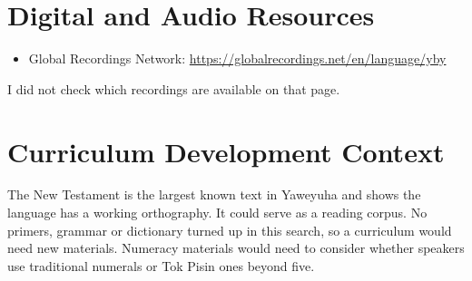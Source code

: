 \documentclass[12pt]{article}
\begin{document}
\section{Digital and Audio Resources}
\begin{itemize}
\item Global Recordings Network: \url{https://globalrecordings.net/en/language/yby}
\end{itemize}
I did not check which recordings are available on that page.

\section{Curriculum Development Context}
The New Testament is the largest known text in Yaweyuha and shows the language has a working orthography. It could serve as a reading corpus. No primers, grammar or dictionary turned up in this search, so a curriculum would need new materials. Numeracy materials would need to consider whether speakers use traditional numerals or Tok Pisin ones beyond five.
\end{document}
